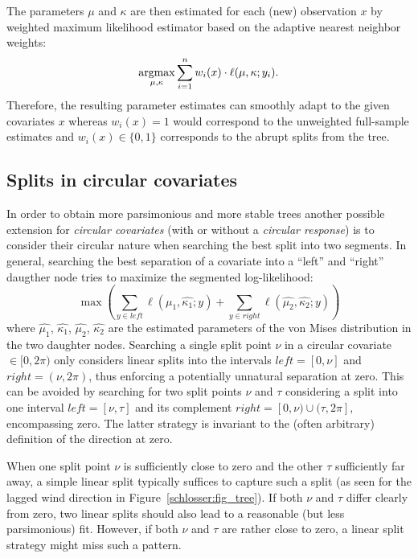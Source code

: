 \documentclass[twoside]{report}
\begin{document}
The parameters $\mu$ and $\kappa$ are then estimated for each (new) 
observation $x$ by weighted maximum likelihood estimator based on the
adaptive nearest neighbor weights:
\begin{equation}
\operatorname{argmax}\displaylimits_{\mu, \kappa} \sum_{i=1}^n w_i(x) \cdot \ell(\mu, \kappa; y_i). 
\end{equation}
Therefore, the resulting parameter estimates can smoothly adapt to the given
covariates $x$ whereas $w_i(x) = 1$ would correspond to the unweighted
full-sample estimates and $w_i(x) \in \{0, 1\}$ corresponds to the abrupt
splits from the tree.

\subsection{Splits in circular covariates}

In order to obtain more parsimonious and more stable trees another possible
extension for \emph{circular covariates} (with or without a \emph{circular response})
is to consider their circular nature when searching the best split into two segments.
In general, searching the best separation of a covariate into a ``left'' and ``right''
daugther node tries to maximize the segmented log-likelihood:
\begin{equation}
\max \left(\sum_{y \in \mathit{left}} \ell(\hat{\mu_1}, \hat{\kappa_1}; y) + \sum_{y \in \mathit{right}} \ell(\hat{\mu_2}, \hat{\kappa_2}; y)\right)
\end{equation}
where $\hat{\mu_1}$, $\hat{\kappa_1}$, $\hat{\mu_2}$, $\hat{\kappa_2}$ are the estimated parameters
of the von Mises distribution in the two daughter nodes. Searching a single split point $\nu$ in a circular covariate $\in [0, 2 \pi)$
only considers linear splits into the intervals $\mathit{left}=[0,\nu]$ and $\mathit{right}=(\nu,2\pi)$,
thus enforcing a potentially unnatural separation at zero. This can be avoided by searching
for two split points $\nu$ and $\tau$ considering a split into one interval $\mathit{left}=[\nu,\tau]$
and its complement $\mathit{right}=[0,\nu) \cup (\tau,2\pi]$, encompassing zero. The latter
strategy is invariant to the (often arbitrary) definition of the direction at zero.

When one split point $\nu$ is sufficiently close to zero and the other $\tau$ sufficiently
far away, a simple linear split typically suffices to capture such a split (as seen for the
lagged wind direction in Figure~\ref{schlosser:fig_tree}). If both $\nu$ and $\tau$ differ
clearly from zero, two linear splits should also lead to a reasonable (but less parsimonious)
fit. However, if both $\nu$ and $\tau$ are rather close to zero, a linear split strategy
might miss such a pattern.
\end{document}
